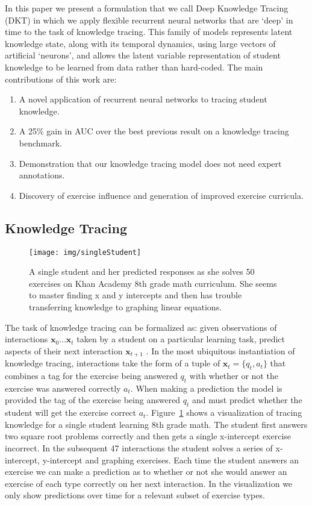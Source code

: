 \documentclass{article} \usepackage{nips,times}
\newcommand{\mb}{\mathbf}
\begin{document}
In this paper we present a formulation that we call Deep Knowledge Tracing (DKT) in which we apply flexible recurrent neural networks that are `deep' in time to the task of knowledge tracing. 
This family of models represents latent knowledge state, along with its temporal dynamics, using large vectors of artificial `neurons', and allows the latent variable representation of student knowledge to be learned from data rather than hard-coded.
The main contributions of this work are:
\begin{enumerate}
\item A novel application of recurrent neural networks to tracing student knowledge.
\item A 25\% gain in AUC over the best previous result on a knowledge tracing benchmark. 
\item Demonstration that our knowledge tracing model does not need expert annotations.
\item Discovery of exercise influence and generation of improved exercise curricula.
\end{enumerate}

\subsection{Knowledge Tracing}
\begin{figure}[t]
\centering
\texttt{[image: img/singleStudent]}
\vspace{-3mm}
\caption{A single student and her predicted responses as she solves 50 exercises on Khan Academy 8th grade math curriculum. She seems to master finding x and y intercepts and then has trouble transferring knowledge to graphing linear equations.
\label{fig:singleStudent}
}
\vspace{-3mm}
\end{figure}



The task of knowledge tracing can be formalized as: given observations of interactions $\mb x_0 \dots \mb x_{t}$ taken by a student on a particular learning task, predict aspects of their next interaction $\mb x_{t+1}$ \cite{corbett1994knowledge}. In the most ubiquitous instantiation of knowledge tracing, interactions take the form of a tuple of $\mb x_t = \{q_t, a_t\}$ that combines a tag for the exercise being answered $q_t$ with whether or not the exercise was answered correctly $a_t$.  When making a prediction the model is provided the tag of the exercise being answered $q_t$ and must predict whether the student will get the exercise correct $a_t$. Figure~\ref{fig:singleStudent} shows a visualization of tracing knowledge for a single student learning 8th grade math. The student first answers two square root problems correctly and then gets a single x-intercept exercise incorrect. In the subsequent 47 interactions the student solves a series of x-intercept, y-intercept and graphing exercises. Each time the student answers an exercise we can make a prediction as to whether or not she would answer an exercise of each type correctly on her next interaction. In the visualization we only show predictions over time for a relevant subset of exercise types.
\end{document}
